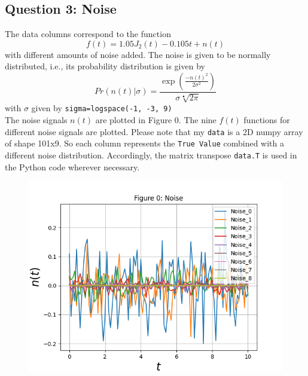 \documentclass[11pt, a4paper]{article}
\begin{document}
  \subsection{Question 3: Noise} 
  The data columns correspond to the function 
  $$f(t)=1.05J_{2}(t)-0.105t+n(t) $$
  with different amounts of noise added. The noise is given to be normally distributed, i.e., its probability distribution is given by
$$Pr(n(t)|\sigma)=\frac{\exp(\frac{-n(t)^2}{2\sigma ^2})}{\sigma \sqrt[•]{2\pi}}$$
with $\sigma$ given by \texttt{sigma=logspace(-1, -3, 9)} \\
The noise signals $n(t)$ are plotted in Figure 0. The nine $f(t)$ functions for different noise signals are plotted. Please note that my \texttt{data} is a 2D numpy array of shape 101x9. So each column represents the \texttt{True Value} combined with a different noise distribution. Accordingly, the matrix transpose \texttt{data.T} is used in the Python code wherever necessary. 
 
   \begin{figure}[!tbh]
   	\centering
   	\includegraphics[scale=0.5]{Figure0_Noise.png} 

   	\label{fig:Q3}
   \end{figure} 
\end{document}
